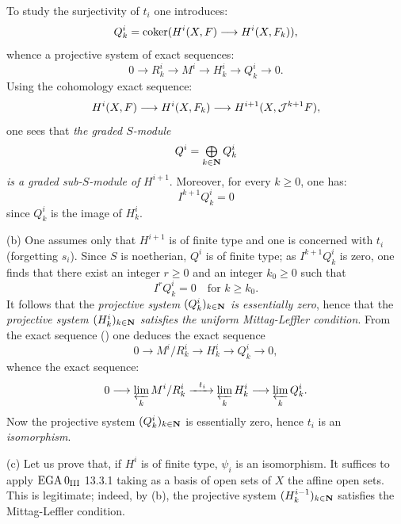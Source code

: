 To study the surjectivity of $t_i$ one introduces:
\begin{equation} \label{eq:IX.1.21} Q_k^i = \coker (H^i(X, F) \to H^i(X, F_k)),
\end{equation}
whence a projective system of exact sequences:
\begin{equation} \label{eq:IX.1.22} 0\to R_k^i \to M^i \to H^i_k \to Q_k^i \to 0.
\end{equation}
Using the cohomology exact sequence:
\begin{equation} \label{eq:IX.1.23}
H^i(X, F)\to H^i(X, F_k)\to H^{i+1}(X, {\Jb}^{k+1}F),
\end{equation}
one sees that \emph{the graded $S$-module}
\begin{equation} \label{eq:IX.1.24}
Q^i=\mathop{\textstyle\bigoplus}\limits_{k \in \mathbf{N}}Q^i_k
\end{equation}
\emph{is a graded sub-}$S$\emph{-module of} $H^{i+1}$. Moreover, for every $k\geq 0$, one has:
\begin{equation} \label{eq:IX.1.25}
I^{k+1}Q^i_k=0
\end{equation}
since $Q_k^i$ is the image of $H^i_k$.

\textup{(b)} \label{stepb} One assumes only that $H^{i+1}$ is of finite type and one is concerned with $t_i$ (forgetting $s_i$). Since $S$ is noetherian, $Q^i$ is of finite type; as $I^{k+1}Q^i_k$ is zero, one finds that there exist an integer $r\geq 0$ and an integer $k_0\geq 0$ such that
\begin{equation} \label{eq:IX.1.26}
I^rQ_k^i=0 \quad \text{for } k\geq k_0.
\end{equation}
It follows that the \emph{projective system} $(Q_k^i)_{k\in \mathbf{N}}$ \emph{is essentially zero}, hence that the \emph{projective system $(H_k^i)_{k\in \mathbf{N}}$ satisfies the uniform Mittag-Leffler condition}. From the exact sequence () one deduces the exact sequence
\begin{equation} \label{eq:IX.1.27}
0 \to M^i/R_k^i \to H^i_k \to Q_k^i \to 0,
\end{equation}
whence the exact sequence:
\begin{equation} \label{eq:IX.1.28}
0\to\varprojlim_{k}M^i/R_k^i \lto{t_i} \varprojlim_{k}H^i_k \to \varprojlim_{k} Q_k^i.
\end{equation}
Now the projective system $(Q_k^i)_{k\in \mathbf{N}}$ is essentially zero, hence $t_i$ is an \emph{isomorphism}.

\indent\textup{(c)} Let us prove that, if $H^i$ is of finite type, $\psi_i$ is an isomorphism. It suffices to apply $\textup{EGA}\kern.2em 0_{\textup{III}}$ 13.3.1 taking as a basis of open sets of $X$ the affine open sets. This is legitimate; indeed, by (b), the projective system $(H_k^{i-1})_{k\in \mathbf{N}}$ satisfies the Mittag-Leffler condition.


